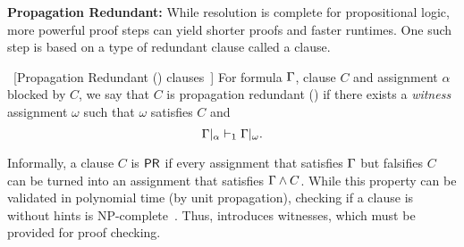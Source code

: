
\textbf{Propagation Redundant:} While resolution is complete for propositional
logic, more powerful proof steps can yield shorter proofs and faster runtimes.
One such step is based on a type of redundant clause called a \pr clause.

\begin{definition}~\label{def:pr}[Propagation Redundant (\pr) clauses~\cite{prclauses}]
    For formula $\Gamma$, clause $C$ and assignment $\alpha$ blocked by $C$,
    we say that $C$ is propagation redundant
    (\pr) if there exists a \emph{witness} assignment $\omega$ such that
    $\omega$ satisfies $C$ and
$$
    \Gamma|_\alpha \vdash_1 \Gamma|_\omega.
$$
\end{definition}


Informally, a clause $C$ is $\textsf{PR}$ if every assignment that satisfies
$\Gamma$ but falsifies $C$ can be turned into an assignment that satisfies
$\Gamma \land C$. While this property can be validated in polynomial time
(by unit propagation), checking if a clause is \pr
without hints is NP-complete~\cite{prclauses}. Thus, \pr introduces witnesses,
which must be provided for proof checking.  






